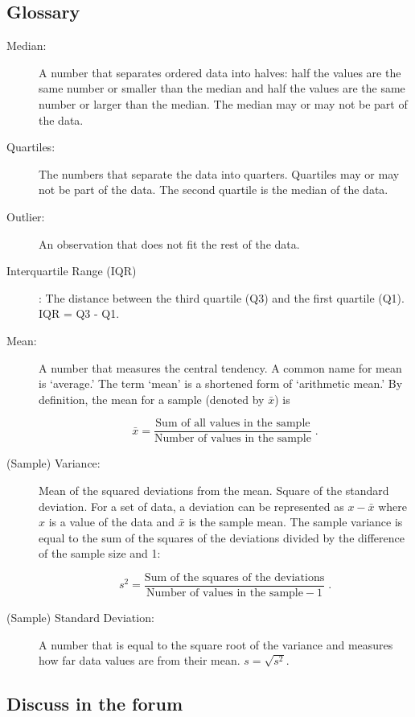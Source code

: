 \documentclass[]{krantz}
\theoremstyle{definition}
\theoremstyle{definition}
\theoremstyle{definition}
\theoremstyle{remark}
\begin{document}
\hypertarget{glossary}{%
\subsection*{Glossary}\label{glossary}}


\begin{description}
\item[Median:]
A number that separates ordered data into halves: half the values
are the same number or smaller than the median and half the values
are the same number or larger than the median. The median may or may
not be part of the data.
\item[Quartiles:]
The numbers that separate the data into quarters. Quartiles may or
may not be part of the data. The second quartile is the median of
the data.
\item[Outlier:]
An observation that does not fit the rest of the data.
\item[Interquartile Range (IQR)]
: The distance between the third quartile (Q3) and the first
quartile (Q1). IQR = Q3 - Q1.
\item[Mean:]
A number that measures the central tendency. A common name for mean
is `average.' The term `mean' is a shortened form of `arithmetic
mean.' By definition, the mean for a sample (denoted by \(\bar x\)) is

\[\bar x = \frac{\mbox{Sum of all values in the sample}}{\mbox{Number of values in the sample}}\;.\]
\item[(Sample) Variance:]
Mean of the squared deviations from the mean. Square of the standard
deviation. For a set of data, a deviation can be represented as
\(x - \bar x\) where \(x\) is a value of the data and \(\bar x\) is the
sample mean. The sample variance is equal to the sum of the squares
of the deviations divided by the difference of the sample size and
1:

\[s^2 = \frac{\mbox{Sum of the squares of the deviations}}{\mbox{Number of values in the sample}-1}\;.\]
\item[(Sample) Standard Deviation:]
A number that is equal to the square root of the variance and
measures how far data values are from their mean. \(s = \sqrt{s^2}\).
\end{description}

\hypertarget{discuss-in-the-forum}{%
\subsection*{Discuss in the forum}\label{discuss-in-the-forum}}
\end{document}
